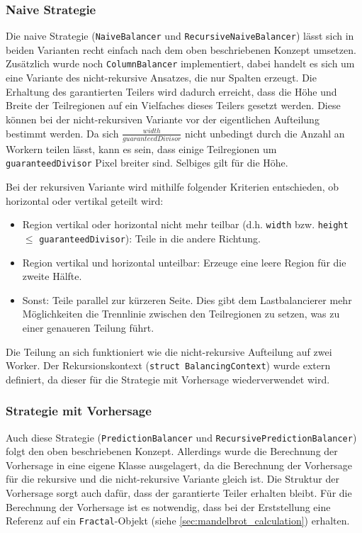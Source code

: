 \subsubsection{Naive Strategie}

Die naive Strategie (\verb|NaiveBalancer| und \verb|RecursiveNaiveBalancer|) lässt sich in beiden Varianten recht einfach nach dem oben beschriebenen Konzept umsetzen.
Zusätzlich wurde noch \verb|ColumnBalancer| implementiert, dabei handelt es sich um eine Variante des nicht-rekursive Ansatzes, die nur Spalten erzeugt.
Die Erhaltung des garantierten Teilers wird dadurch erreicht, dass die Höhe und Breite der Teilregionen auf ein Vielfaches dieses Teilers gesetzt werden.
Diese können bei der nicht-rekursiven Variante vor der eigentlichen Aufteilung bestimmt werden.
Da sich $\frac{width}{guaranteedDivisor}$ nicht unbedingt durch die Anzahl an Workern teilen lässt, kann es sein, dass einige Teilregionen um \verb|guaranteedDivisor| Pixel breiter sind.
Selbiges gilt für die Höhe.

Bei der rekursiven Variante wird mithilfe folgender Kriterien entschieden, ob horizontal oder vertikal geteilt wird:

\begin{itemize}
	\item Region vertikal oder horizontal nicht mehr teilbar (d.h. \verb|width| bzw. \verb|height| $\leq$ \verb|guaranteedDivisor|): Teile in die andere Richtung.
	\item Region vertikal und horizontal unteilbar: Erzeuge eine leere Region für die zweite Hälfte.
	\item Sonst: Teile parallel zur kürzeren Seite. Dies gibt dem Lastbalancierer mehr Möglichkeiten die Trennlinie zwischen den Teilregionen zu setzen, was zu einer genaueren Teilung führt.
\end{itemize}

Die Teilung an sich funktioniert wie die nicht-rekursive Aufteilung auf zwei Worker.
Der Rekursionskontext (\verb|struct BalancingContext|) wurde extern definiert, da dieser für die Strategie mit Vorhersage wiederverwendet wird.

\subsubsection{Strategie mit Vorhersage}

Auch diese Strategie (\verb|PredictionBalancer| und \verb|RecursivePredictionBalancer|) folgt den oben beschriebenen Konzept. 
Allerdings wurde die Berechnung der Vorhersage in eine eigene Klasse ausgelagert, da die Berechnung der Vorhersage für die rekursive und die nicht-rekursive Variante gleich ist.
Die Struktur der Vorhersage sorgt auch dafür, dass der garantierte Teiler erhalten bleibt.
Für die Berechnung der Vorhersage ist es notwendig, dass bei der Erststellung eine Referenz auf ein \verb|Fractal|-Objekt (siehe \ref{sec:mandelbrot_calculation}) erhalten.

